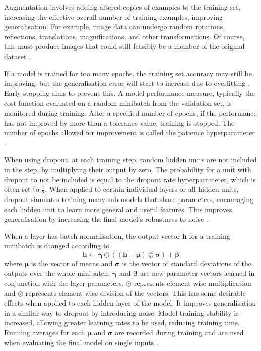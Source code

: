 \documentclass[12pt]{article}
\begin{document}
Augmentation involves adding altered copies of examples to the training set, increasing the effective overall number of training examples, improving generalisation. For example, image data can undergo random rotations, reflections, translations, magnifications, and other transformations. Of course, this must produce images that could still feasibly be a member of the original dataset \cite{Goodfellow16}.

If a model is trained for too many epochs, the training set accuracy may still be improving, but the generalisation error will start to increase due to overfitting \cite{Bishop95, Goodfellow16}. Early stopping aims to prevent this. A model performance measure, typically the cost function evaluated on a random minibatch from the validation set, is monitored during training. After a specified number of epochs, if the performance has not improved by more than a tolerance value, training is stopped. The number of epochs allowed for improvement is called the patience hyperparameter \cite{Goodfellow16}.

When using dropout, at each training step, random hidden units are not included in the step, by multiplying their output by zero. The probability for a unit with dropout to not be included is equal to the dropout rate hyperparameter, which is often set to $\frac{1}{2}$. When applied to certain individual layers or all hidden units, dropout simulates training many sub-models that share parameters, encouraging each hidden unit to learn more general and useful features. This improves generalisation by increasing the final model's robustness to noise \cite{Srivastava2014}.

When a layer has batch normalisation, the output vector $\bm{h}$ for a training minibatch is changed according to
\begin{equation}
\bm{h}\leftarrow\bm{\gamma}\odot((\bm{h}-\bm{\mu})\oslash{\bm{\sigma}})+\bm{\beta}
\end{equation}
where $\bm{\mu}$ is the vector of means and $\bm{\sigma}$ is the vector of standard deviations of the outputs over the whole minibatch. $\bm{\gamma}$ and $\bm{\beta}$ are new parameter vectors learned in conjunction with the layer parameters. $\odot$ represents element-wise multiplication and $\oslash$ represents element-wise division of the vectors. This has some desirable effects when applied to each hidden layer of the model. It improves generalisation in a similar way to dropout by introducing noise. Model training stability is increased, allowing greater learning rates to be used, reducing training time. Running averages for each $\bm{\mu}$ and $\bm{\sigma}$ are recorded during training and are used when evaluating the final model on single inputs \cite{Ioffe15}.
\end{document}

